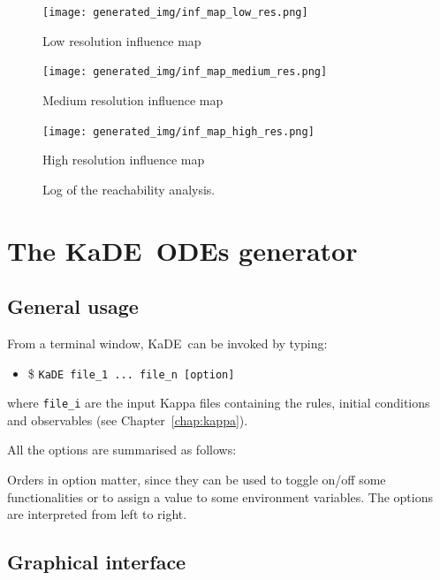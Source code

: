\documentclass[11pt]{book}
\def\KaDE{\textsf{KaDE}}
\def\ttt#1{\texttt{#1}}
\def\ITE#1{\begin{itemize}#1\end{itemize}}
\begin{document}
\begin{figure}[htbp]
\begin{center}
\texttt{[image: generated\_img/inf\_map\_low\_res.png]}
\caption{Low resolution influence map}
\label{fig:low-res}
\end{center}
\end{figure}
\begin{figure}[htbp]
\begin{center}
\texttt{[image: generated\_img/inf\_map\_medium\_res.png]}
\caption{Medium resolution influence map}
\label{fig:medium-res}
\end{center}
\end{figure}
\begin{figure}[htbp]
\begin{center}
\texttt{[image: generated\_img/inf\_map\_high\_res.png]}
\caption{High resolution influence map}
\label{fig:high-res}
\end{center}
\end{figure}

\begin{figure}[t]

\caption{Log of the reachability analysis.}
\label{fig:reachability_influence}
\end{figure}

\chapter{The \KaDE~ODEs generator}

\section{General usage}

From a terminal window, \KaDE~can be invoked by typing:
\ITE{
\item[\$] \ttt{KaDE file\_1 ... file\_n  [option]}
}
where \ttt{file\_i} are the input Kappa files containing the rules, initial conditions and observables (see Chapter~\ref{chap:kappa}).

All the options are summarised as follows:


Orders in option matter, since they can be used to toggle on/off some functionalities or to assign a value to some environment variables.
The options are interpreted from left to right.

\section{Graphical interface}
\end{document}
